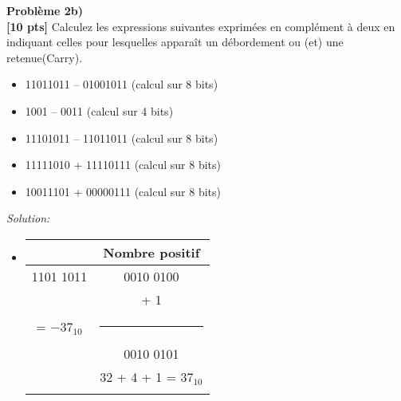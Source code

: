 \documentclass{article}
\newenvironment{problem}[2][Problème]
    { \begin{mdframed}[backgroundcolor=gray!20] \textbf{#1 #2} \\}
    {  \end{mdframed}}
\newenvironment{solution}
    {\textit{Solution:}}
    {}
\begin{document}
\begin{problem}{2b)}
\textbf{[10 pts]} Calculez les expressions suivantes exprimées en complément à deux en indiquant
celles pour lesquelles apparaît un débordement ou (et) une retenue(Carry).
\begin{itemize}
        \item 11011011 – 01001011 (calcul sur 8 bits)
        \item 1001 – 0011 (calcul sur 4 bits)
        \item 11101011 – 11011011 (calcul sur 8 bits)
        \item 11111010 + 11110111 (calcul sur 8 bits)
        \item 10011101 + 00000111 (calcul sur 8 bits)
    \end{itemize}
\end{problem}
\begin{solution}
    \begin{itemize}
        \item
        
        
        \begin{tabular}{|c|c|}
        \hline
         & Nombre positif\\
        \hline    
        1101 1011           &       0010 0100                   \\
        \hspace{101pt}      &       + \hspace{25pt} 1           \\
        = $-37_{10}$        &       \rule{1in}{1pt}             \\
        \hspace{5pt}        &       0010 0101                   \\
        \hspace{5pt}        &       32 + 4 + 1 = $37_{10}$      \\
                            &       \hspace{100pt}              \\
        \hline
        \end{tabular}
        
        \hspace{40pt}
        

\end{itemize}
\end{solution}
\end{document}

